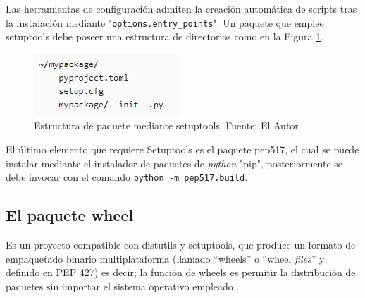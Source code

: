 Las herramientas de configuración admiten la creación automática de scripts tras la instalación mediante "\texttt{options.entry_points}". Un paquete que emplee setuptools debe poseer una estructura de directorios como en la Figura \ref{estructuraSetupTools}.
\begin{figure}[H]
    \centering
    \includegraphics{Recursos/estructuraSetupTools.jpg}
    \caption[Estructura de paquete mediante setuptools.]{Estructura de paquete mediante setuptools. Fuente: El Autor}
    \label{estructuraSetupTools}
\end{figure}
El último elemento que requiere Setuptools es el paquete pep517, el cual se puede instalar mediante el instalador de paquetes de \textit{python} "pip", posteriormente se debe invocar con el comando \texttt{python -m pep517.build}.
\subsection{El paquete wheel}
Es un proyecto compatible con distutils y setuptools, que produce un formato de empaquetado binario multiplataforma (llamado ``wheels'' o ``wheel \textit{files}'' y definido en PEP 427) es decir; la función de wheels es permitir la distribución de paquetes sin importar el sistema operativo empleado \cite{wheel}.

